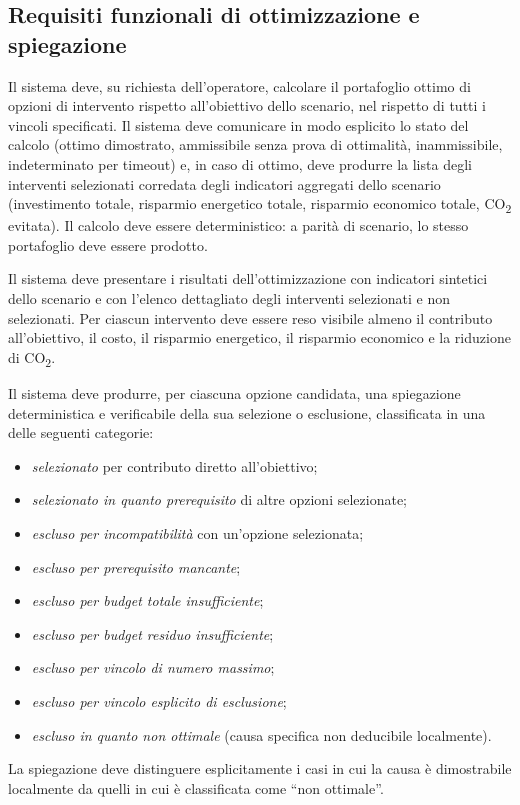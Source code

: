 \subsection{Requisiti funzionali di ottimizzazione e spiegazione}

 \label{rf:ottimizzazione}
Il sistema deve, su richiesta dell'operatore, calcolare il portafoglio ottimo di opzioni di intervento rispetto all'obiettivo dello scenario, nel rispetto di tutti i vincoli specificati. Il sistema deve comunicare in modo esplicito lo stato del calcolo (ottimo dimostrato, ammissibile senza prova di ottimalità, inammissibile, indeterminato per timeout) e, in caso di ottimo, deve produrre la lista degli interventi selezionati corredata degli indicatori aggregati dello scenario (investimento totale, risparmio energetico totale, risparmio economico totale, CO\textsubscript{2} evitata). Il calcolo deve essere deterministico: a parità di scenario, lo stesso portafoglio deve essere prodotto.

 \label{rf:risultati}
Il sistema deve presentare i risultati dell'ottimizzazione con indicatori sintetici dello scenario e con l'elenco dettagliato degli interventi selezionati e non selezionati. Per ciascun intervento deve essere reso visibile almeno il contributo all'obiettivo, il costo, il risparmio energetico, il risparmio economico e la riduzione di CO\textsubscript{2}.

 \label{rf:spiegazioni}
Il sistema deve produrre, per ciascuna opzione candidata, una spiegazione deterministica e verificabile della sua selezione o esclusione, classificata in una delle seguenti categorie:
\begin{itemize}
    \item \emph{selezionato} per contributo diretto all'obiettivo;
    \item \emph{selezionato in quanto prerequisito} di altre opzioni selezionate;
    \item \emph{escluso per incompatibilità} con un'opzione selezionata;
    \item \emph{escluso per prerequisito mancante};
    \item \emph{escluso per budget totale insufficiente};
    \item \emph{escluso per budget residuo insufficiente};
    \item \emph{escluso per vincolo di numero massimo};
    \item \emph{escluso per vincolo esplicito di esclusione};
    \item \emph{escluso in quanto non ottimale} (causa specifica non deducibile localmente).
\end{itemize}
La spiegazione deve distinguere esplicitamente i casi in cui la causa è dimostrabile localmente da quelli in cui è classificata come ``non ottimale''.

